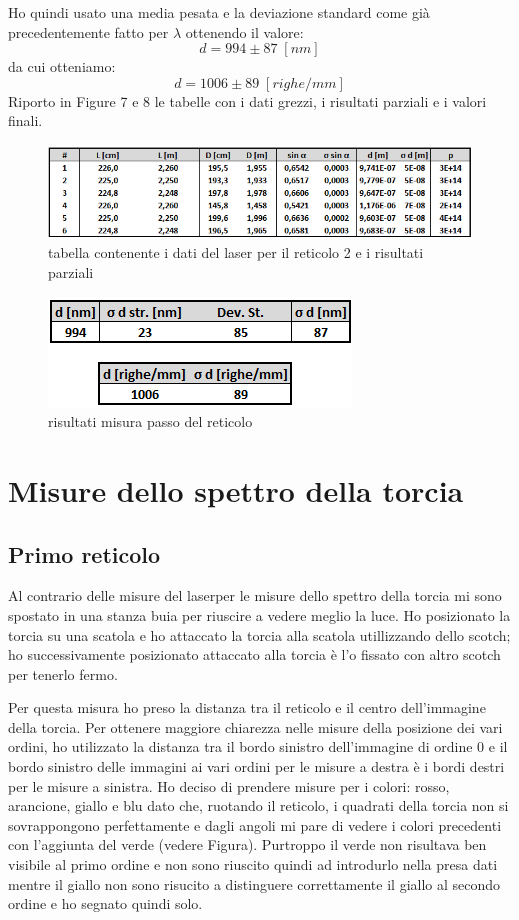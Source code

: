 \documentclass{article}
\begin{document}
Ho quindi usato una media pesata e la deviazione standard come già precedentemente fatto per $\lambda$ ottenendo il valore:
\[ d = 994 \pm 87 \; [nm] \]
da cui otteniamo:
\[ d = 1006 \pm 89 \; [righe/mm] \]
Riporto in Figure 7 e 8 le tabelle con i dati grezzi, i risultati parziali e i valori finali.

\begin{figure}[h!]
  \centering
  \includegraphics[width=1\linewidth]{IM tabella laser 2}
  \caption{tabella contenente i dati del laser per il reticolo 2 e i risultati parziali}
\end{figure}

\begin{figure}[h!]
  \centering
  \includegraphics[width=0.4\linewidth]{IM risultati laser 2}
  \caption{risultati misura passo del reticolo}
\end{figure}




\pagebreak
\section{Misure dello spettro della torcia}
\subsection{Primo reticolo}
Al contrario delle misure del laserper le misure dello spettro della torcia mi sono spostato in una stanza buia per riuscire a vedere meglio la luce. Ho posizionato la torcia su una scatola e ho attaccato la torcia alla scatola utillizzando dello scotch; ho successivamente posizionato attaccato alla torcia è l'o fissato con altro scotch per tenerlo fermo.

Per questa misura ho preso la distanza tra il reticolo e il centro dell'immagine della torcia. Per ottenere maggiore chiarezza nelle misure della posizione dei vari ordini, ho utilizzato la distanza tra il bordo sinistro dell'immagine di ordine 0 e il bordo sinistro delle immagini ai vari ordini per le misure a destra è i bordi destri per le misure a sinistra. Ho deciso di prendere misure per i colori: rosso, arancione, giallo e blu dato che, ruotando il reticolo, i quadrati della torcia non si sovrappongono perfettamente e dagli angoli mi pare di vedere i colori precedenti con l'aggiunta del verde (vedere Figura).%
 Purtroppo il verde non risultava ben visibile al primo ordine e non sono riuscito quindi ad introdurlo nella presa dati mentre il giallo non sono risucito a distinguere correttamente il giallo al secondo ordine e ho segnato quindi solo.
\end{document}
